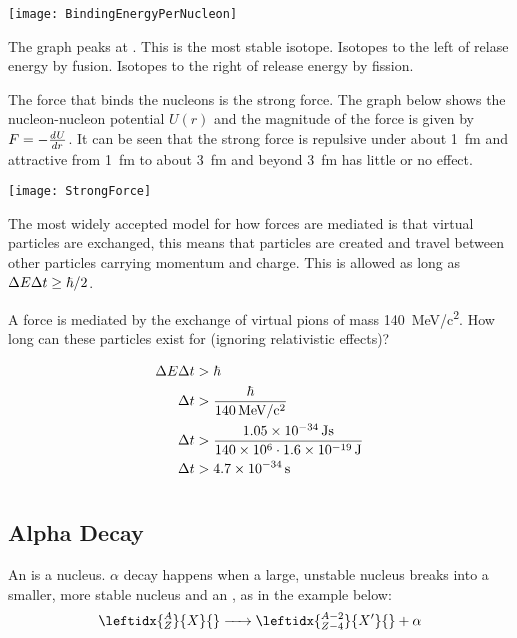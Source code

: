 \begin{center}
\texttt{[image: BindingEnergyPerNucleon]}
\end{center}

The graph peaks at . This is the most stable isotope. Isotopes to the left of  relase energy by fusion. Isotopes to the right of  release energy by fission.

The force that binds the nucleons is the strong force. The graph below shows the nucleon-nucleon potential \(U(r)\) and the magnitude of the force is given by \(F=-\dv Ur\). It can be seen that the strong force is repulsive under about \SI{1}{fm} and attractive from \SI{1}{fm} to about \SI{3}{fm} and beyond \SI{3}{fm} has little or no effect.

\begin{center}
\texttt{[image: StrongForce]}
\end{center}

The most widely accepted model for how forces are mediated is that virtual particles are exchanged, this means that particles are created and travel between other particles carrying momentum and charge. This is allowed as long as \(\Delta E\Delta t\ge\hb/2\).

\begin{example}
A force is mediated by the exchange of virtual pions of mass \SI{140}{MeV/c^2}. How long can these particles exist for (ignoring relativistic effects)?

\begin{align*}
\Delta E\Delta t&>\hb\\
\Delta t&>\frac{\hb}{\SI{140}{MeV/c^2}}\\
\Delta t&>\frac{\num{1.05e-34}\,\si{Js}}{\num{140e6}\cdot\num{1.6e-19}\,\si{J}}\\
\Delta t&>\num{4.7e-34}\,\si{s}
\end{align*}
\end{example}

\section{}

\subsection*{Alpha Decay}

An \aparticle is a  nucleus. \(\alpha\) decay happens when a large, unstable nucleus breaks into a smaller, more stable nucleus and an \aparticle, as in the example below:
\[\leftidx{_Z^A}{X}{}\ce{->}\leftidx{_{Z-4}^{A-2}}{X'}{}+\alpha\]
